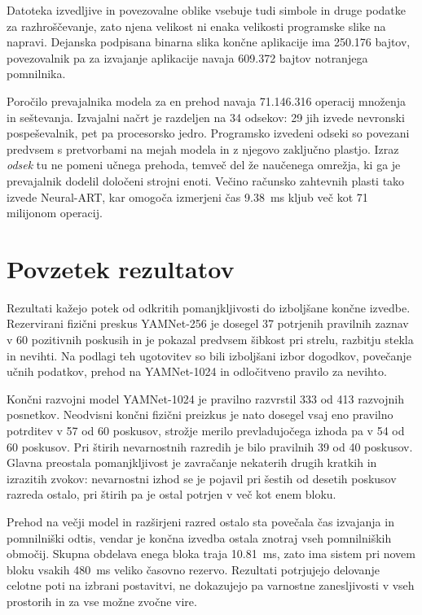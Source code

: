 Datoteka izvedljive in povezovalne oblike vsebuje tudi simbole in druge podatke
za razhroščevanje, zato njena velikost ni enaka velikosti programske slike na
napravi. Dejanska podpisana binarna slika končne aplikacije ima 250.176 bajtov,
povezovalnik pa za izvajanje aplikacije navaja 609.372 bajtov notranjega
pomnilnika.

Poročilo prevajalnika modela za en prehod navaja 71.146.316 operacij množenja
in seštevanja. Izvajalni načrt je razdeljen na 34 odsekov: 29 jih izvede
nevronski pospeševalnik, pet pa procesorsko jedro. Programsko izvedeni odseki
so povezani predvsem s pretvorbami na mejah modela in z njegovo zaključno
plastjo. Izraz \emph{odsek} tu ne pomeni učnega prehoda, temveč del že
naučenega omrežja, ki ga je prevajalnik dodelil določeni strojni enoti. Večino
računsko zahtevnih plasti tako izvede Neural-ART, kar omogoča izmerjeni čas
\SI{9.38}{\milli\second} kljub več kot 71 milijonom operacij.

\section{Povzetek rezultatov}

Rezultati kažejo potek od odkritih pomanjkljivosti do izboljšane končne
izvedbe. Rezervirani fizični preskus YAMNet-256 je dosegel 37 potrjenih pravilnih
zaznav v 60 pozitivnih poskusih in je pokazal predvsem šibkost pri strelu,
razbitju stekla in nevihti. Na podlagi teh ugotovitev so bili izboljšani izbor
dogodkov, povečanje učnih podatkov, prehod na YAMNet-1024 in odločitveno pravilo
za nevihto.

Končni razvojni model YAMNet-1024 je pravilno razvrstil 333 od 413 razvojnih
posnetkov. Neodvisni končni fizični preizkus je nato dosegel vsaj eno pravilno
potrditev v 57 od 60 poskusov, strožje merilo prevladujočega izhoda pa v 54 od
60 poskusov. Pri štirih nevarnostnih razredih je bilo pravilnih 39 od 40
poskusov. Glavna preostala pomanjkljivost je zavračanje nekaterih drugih
kratkih in izrazitih zvokov: nevarnostni izhod se je pojavil pri šestih od
desetih poskusov razreda ostalo, pri štirih pa je ostal potrjen v več kot enem
bloku.

Prehod na večji model in razširjeni razred ostalo sta povečala čas izvajanja in
pomnilniški odtis, vendar je končna izvedba ostala znotraj vseh pomnilniških
območij. Skupna obdelava enega bloka traja \SI{10.81}{\milli\second}, zato ima
sistem pri novem bloku vsakih \SI{480}{\milli\second} veliko časovno rezervo.
Rezultati potrjujejo delovanje celotne poti na izbrani postavitvi, ne dokazujejo
pa varnostne zanesljivosti v vseh prostorih in za vse možne zvočne vire.
